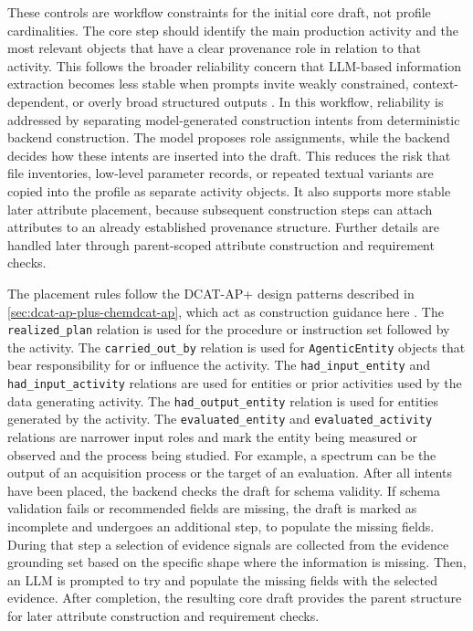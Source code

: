 These controls are workflow constraints for the initial core draft, not profile cardinalities.
The core step should identify the main production activity and the most relevant objects that have a clear provenance role in relation to that activity.
This follows the broader reliability concern that \ac{LLM}-based information extraction becomes less stable when prompts invite weakly constrained, context-dependent, or overly broad structured outputs \cite{xu2024generativeie,liu2024lostmiddle}.
In this workflow, reliability is addressed by separating model-generated construction intents from deterministic backend construction.
The model proposes role assignments, while the backend decides how these intents are inserted into the draft.
This reduces the risk that file inventories, low-level parameter records, or repeated textual variants are copied into the profile as separate activity objects.
It also supports more stable later attribute placement, because subsequent construction steps can attach attributes to an already established provenance structure.
Further details are handled later through parent-scoped attribute construction and requirement checks.

The placement rules follow the \ac{DCAT-AP+} design patterns described in \cref{sec:dcat-ap-plus-chemdcat-ap}, which act as construction guidance here \cite{dcatapplusDocumentation}.
The \texttt{realized\_\allowbreak plan} relation is used for the procedure or instruction set followed by the activity.
The \texttt{carried\_out\_\allowbreak by} relation is used for \texttt{Agentic\allowbreak Entity} objects that bear responsibility for or influence the activity.
The \texttt{had\_input\_\allowbreak entity} and \texttt{had\_input\_\allowbreak activity} relations are used for entities or prior activities used by the data generating activity.
The \texttt{had\_output\_\allowbreak entity} relation is used for entities generated by the activity.
The \texttt{evaluated\_\allowbreak entity} and \texttt{evaluated\_\allowbreak activity} relations are narrower input roles and mark the entity being measured or observed and the process being studied.
For example, a spectrum can be the output of an acquisition process or the target of an evaluation.
After all intents have been placed, the backend checks the draft for schema validity.
If schema validation fails or recommended fields are missing, the draft is marked as incomplete and undergoes an additional step, to populate the missing fields.
During that step a selection of evidence signals are collected from the evidence grounding set based on the specific shape where the information is missing.
Then, an \ac{LLM} is prompted to try and populate the missing fields with the selected evidence.
After completion, the resulting core draft provides the parent structure for later attribute construction and requirement checks.

